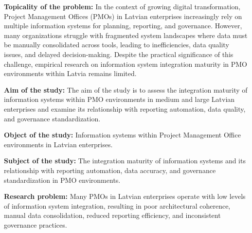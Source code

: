 
\textbf{Topicality of the problem:}
In the context of growing digital transformation, Project Management Offices (PMOs)
in Latvian enterprises increasingly rely on multiple information systems for planning,
reporting, and governance. However, many organizations struggle with fragmented system
landscapes where data must be manually consolidated across tools, leading to
inefficiencies, data quality issues, and delayed decision-making. Despite the practical
significance of this challenge, empirical research on information system integration
maturity in PMO environments within Latvia remains limited.

\textbf{Aim of the study:}
The aim of the study is to assess the integration maturity of information systems
within PMO environments in medium and large Latvian enterprises and examine its
relationship with reporting automation, data quality, and governance standardization.

\textbf{Object of the study:}
Information systems within Project Management Office environments in Latvian enterprises.

\textbf{Subject of the study:}
The integration maturity of information systems and its relationship with reporting
automation, data accuracy, and governance standardization in PMO environments.

\textbf{Research problem:}
Many PMOs in Latvian enterprises operate with low levels of information system
integration, resulting in poor architectural coherence, manual data consolidation,
reduced reporting efficiency, and inconsistent governance practices.

